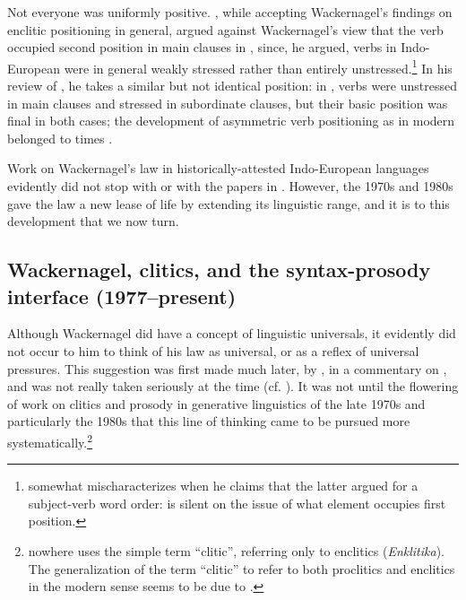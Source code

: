 Not everyone was uniformly positive. \citet[81--83]{Delbrueck1900}, while accepting Wackernagel's findings on enclitic positioning in general, argued against Wackernagel's view that the verb occupied second position in main clauses in , since, he argued, verbs in Indo-European were in general weakly stressed rather than entirely unstressed.\footnote{\citet[81]{Delbrueck1900} somewhat mischaracterizes \citet{Wackernagel1892} when he claims that the latter argued for a subject-verb word order: \citet{Wackernagel1892} is silent on the issue of what element occupies first position.} In his review of \citet{Ries1907}, he takes a similar but not identical position: in , verbs were unstressed in main clauses and stressed in subordinate clauses, but their basic position was final in both cases; the development of asymmetric verb positioning as in modern  belonged to  times \citep[75--76]{Delbrueck1907}.

Work on Wackernagel's law in historically-attested Indo-European languages evidently did not stop with \citet{Watkins1964} or with the papers in \citet{EichnerRix1990}. However, the 1970s and 1980s gave the law a new lease of life by extending its linguistic range, and it is to this development that we now turn.

\subsection{Wackernagel, clitics, and the syntax-prosody interface (1977--present)}

Although Wackernagel did have a concept of linguistic universals, it evidently did not occur to him to think of his law as universal, or as a reflex of universal pressures. This suggestion was first made much later, by \citet[613]{Kurylowicz1958}, in a commentary on \citet{Ivanov1958}, and was not really taken seriously at the time (cf. \citealp[1036]{Watkins1964}). It was not until the flowering of work on clitics and prosody in generative linguistics of the late 1970s and particularly the 1980s that this line of thinking came to be pursued more systematically.\footnote{\citet{Wackernagel1892} nowhere uses the simple term ``clitic'', referring only to enclitics (\textit{Enklitika}). The generalization of the term ``clitic'' to refer to both proclitics and enclitics in the modern sense seems to be due to \citet[155]{Nida1946} \citep{Haspelmath2015}.}

